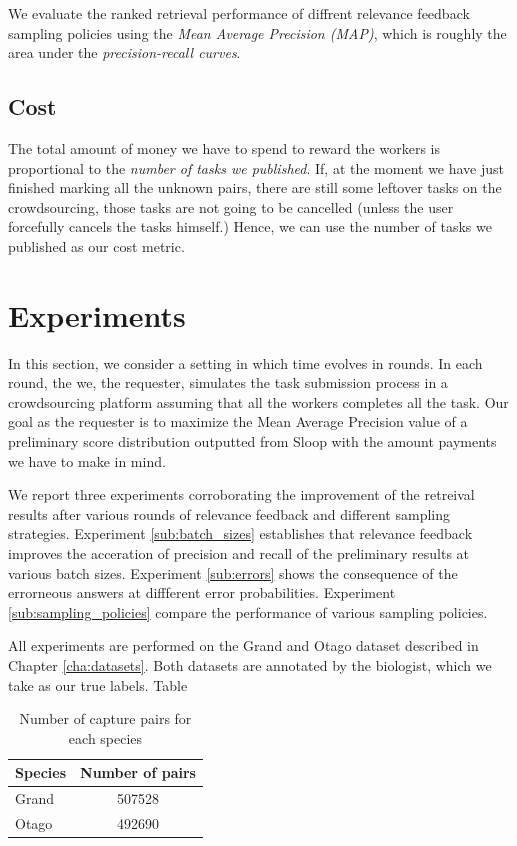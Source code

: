 We evaluate the ranked retrieval performance of diffrent relevance feedback sampling policies using the \emph{Mean Average Precision (MAP)}, which is roughly the area under the \emph{precision-recall curves}.

\subsection{Cost} %
\label{sub:cost}
The total amount of money we have to spend to reward the workers is proportional to the \emph{number of tasks we published}. If, at the moment we have just finished marking all the unknown pairs, there are still some leftover tasks on the crowdsourcing, those tasks are not going to be cancelled (unless the user forcefully cancels the tasks himself.) Hence, we can use the number of tasks we published as our cost metric.


\section{Experiments} %
\label{sec:experiments}

In this section, we consider a setting in which time evolves in rounds. In each round, the we, the requester, simulates the task submission process in a crowdsourcing platform assuming that all the workers completes all the task. Our goal as the requester is to maximize the Mean Average Precision value of a preliminary score distribution outputted from Sloop with the amount payments we have to make in mind.

We report three experiments corroborating the improvement of the retreival results after various rounds of relevance feedback and different sampling strategies. 
Experiment \ref{sub:batch_sizes} establishes that relevance feedback improves the acceration of precision and recall of the preliminary results at various batch sizes.
Experiment \ref{sub:errors} shows the consequence of the errorneous answers at diffferent error probabilities.
Experiment \ref{sub:sampling_policies} compare the performance of various sampling policies.

All experiments are performed on the Grand and Otago dataset described in Chapter \ref{cha:datasets}. Both datasets are annotated by the biologist, which we take as our true labels. Table 

\begin{table}[t]
\captionsetup{justification=centering}
  \caption{Number of capture pairs for each species}
  \label{species-num-pairs}
  \centering
  \begin{tabular}{lc}
    \toprule
    Species & Number of pairs \\
    \midrule
    Grand & 507528 \\
    Otago & 492690 \\
    \bottomrule
  \end{tabular}
\end{table}

